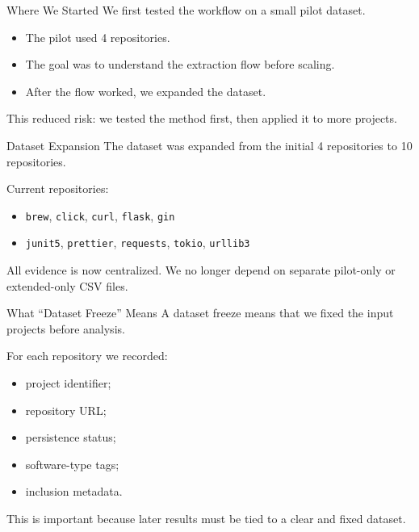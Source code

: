 \documentclass[aspectratio=169,11pt]{beamer}
\begin{document}
\begin{frame}{Where We Started}
  We first tested the workflow on a small pilot dataset.

  \begin{itemize}
    \item The pilot used 4 repositories.
    \item The goal was to understand the extraction flow before scaling.
    \item After the flow worked, we expanded the dataset.
  \end{itemize}

  \vspace{0.3cm}
  This reduced risk: we tested the method first, then applied it to more projects.
\end{frame}

\begin{frame}{Dataset Expansion}
  The dataset was expanded from the initial 4 repositories to 10 repositories.

  \vspace{0.2cm}
  Current repositories:
  \begin{itemize}
    \item \texttt{brew}, \texttt{click}, \texttt{curl}, \texttt{flask}, \texttt{gin}
    \item \texttt{junit5}, \texttt{prettier}, \texttt{requests}, \texttt{tokio}, \texttt{urllib3}
  \end{itemize}

  \vspace{0.3cm}
  All evidence is now centralized. We no longer depend on separate pilot-only or extended-only CSV files.
\end{frame}

\begin{frame}{What ``Dataset Freeze'' Means}
  A dataset freeze means that we fixed the input projects before analysis.

  \vspace{0.2cm}
  For each repository we recorded:
  \begin{itemize}
    \item project identifier;
    \item repository URL;
    \item persistence status;
    \item software-type tags;
    \item inclusion metadata.
  \end{itemize}

  \vspace{0.3cm}
  This is important because later results must be tied to a clear and fixed dataset.
\end{frame}
\end{document}
